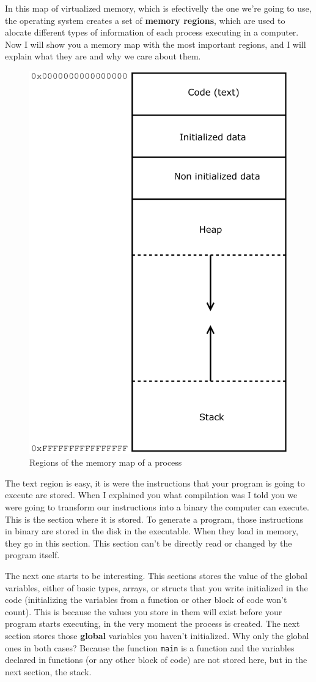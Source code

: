 \documentclass[a4paper]{article}
\begin{document}
In this map of virtualized memory, which is efectivelly the one we're going to
use, the operating system creates a set of \textbf{memory regions}, which are
used to alocate different types of information of each process executing in a
computer.
Now I will show you a memory map with the most important regions, and I will
explain what they are and why we care about them.
\begin{figure}[H]
    \center
    \includegraphics[width=0.5\linewidth]{regionsMemoryMap_en}
    \caption{Regions of the memory map of a process}
    \label{img:regionsMemoryMap}
\end{figure}

The text region is easy, it is were the instructions that your program is going
to execute are stored. When I explained you what compilation was I told you we
were going to transform our instructions into a binary the computer can execute.
This is the section where it is stored. To generate a program, those
instructions in binary are stored in the disk in the executable. When they load
in memory, they go in this section. This section can't be directly read or
changed by the program itself.

The next one starts to be interesting. This sections stores the value of the
global variables, either of basic types, arrays, or structs that you write
initialized in the code (initializing the variables from a function or other
block of code won't count). This is because the values you store in them will
exist before your program starts executing, in the very moment the process is
created. The next section stores those \textbf{global} variables you haven't
initialized. Why only the global ones in both cases? Because the function
\verb!main! is a function and the variables declared in functions (or any other
block of code) are not stored here, but in the next section, the stack.
\end{document}
